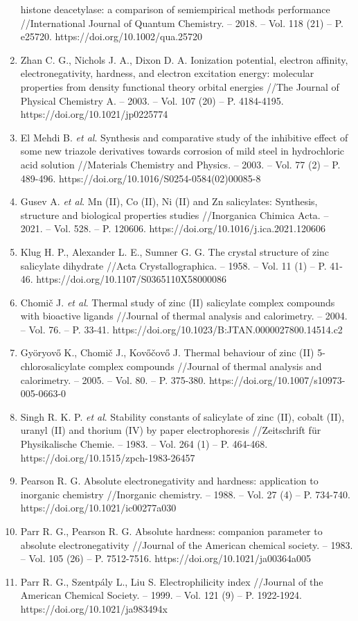 \begin{enumerate}
  histone deacetylase: a comparison of semiempirical methods performance
  //International Journal of Quantum Chemistry. -- 2018. -- Vol. 118
  (21) -- P. e25720. https://doi.org/10.1002/qua.25720
\item
  Zhan C. G., Nichols J. A., Dixon D. A. Ionization potential, electron
  affinity, electronegativity, hardness, and electron excitation energy:
  molecular properties from density functional theory orbital energies
  //The Journal of Physical Chemistry A. -- 2003. -- Vol. 107 (20) -- P.
  4184-4195. https://doi.org/10.1021/jp0225774
\item
  El Mehdi B. \emph{et al}. Synthesis and comparative study of the
  inhibitive effect of some new triazole derivatives towards corrosion
  of mild steel in hydrochloric acid solution //Materials Chemistry and
  Physics. -- 2003. -- Vol. 77 (2) -- P. 489-496.
  https://doi.org/10.1016/S0254-0584(02)00085-8
\item
  Gusev A. \emph{et al}. Mn (II), Co (II), Ni (II) and Zn salicylates:
  Synthesis, structure and biological properties studies //Inorganica
  Chimica Acta. -- 2021. -- Vol. 528. -- P. 120606.
  https://doi.org/10.1016/j.ica.2021.120606
\item
  Klug H. P., Alexander L. E., Sumner G. G. The crystal structure of
  zinc salicylate dihydrate //Acta Crystallographica. -- 1958. -- Vol.
  11 (1) -- P. 41-46. https://doi.org/10.1107/S0365110X58000086
\item
  Chomič J. \emph{et al}. Thermal study of zinc (II) salicylate complex
  compounds with bioactive ligands //Journal of thermal analysis and
  calorimetry. -- 2004. -- Vol. 76. -- P. 33-41.
  https://doi.org/10.1023/B:JTAN.0000027800.14514.c2
\item
  Györyovő K., Chomič J., Kovőčovő J. Thermal behaviour of zinc (II)
  5-chlorosalicylate complex compounds //Journal of thermal analysis and
  calorimetry. -- 2005. -- Vol. 80. -- P. 375-380.
  https://doi.org/10.1007/s10973-005-0663-0
\item
  Singh R. K. P. \emph{et al}. Stability constants of salicylate of zinc
  (II), cobalt (II), uranyl (II) and thorium (IV) by paper
  electrophoresis //Zeitschrift für Physikalische Chemie. -- 1983. --
  Vol. 264 (1) -- P. 464-468. https://doi.org/10.1515/zpch-1983-26457
\item
  Pearson R. G. Absolute electronegativity and hardness: application to
  inorganic chemistry //Inorganic chemistry. -- 1988. -- Vol. 27 (4) --
  P. 734-740. https://doi.org/10.1021/ic00277a030
\item
  Parr R. G., Pearson R. G. Absolute hardness: companion parameter to
  absolute electronegativity //Journal of the American chemical society.
  -- 1983. -- Vol. 105 (26) -- P. 7512-7516.
  https://doi.org/10.1021/ja00364a005
\item
  Parr R. G., Szentpály L., Liu S. Electrophilicity index //Journal of
  the American Chemical Society. -- 1999. -- Vol. 121 (9) -- P.
  1922-1924. https://doi.org/10.1021/ja983494x
\end{enumerate}

